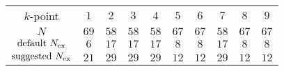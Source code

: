 \begin{tabular}{cccccccccc}
$k$-point & $1$ & $2$ & $3$ & $4$ & $5$ & $6$ & $7$ & $8$ & $9$\\
$N$ & $69$ & $58$ & $58$ & $58$ & $67$ & $67$ & $58$ & $67$ & $67$\\
$\text{default } N_{\rm ex}$ & $6$ & $17$ & $17$ & $17$ & $8$ & $8$ & $17$ & $8$ & $8$\\
$\text{suggested } N_{\rm ex}$ & $21$ & $29$ & $29$ & $29$ & $12$ & $12$ & $29$ & $12$ & $12$\\
\end{tabular}
